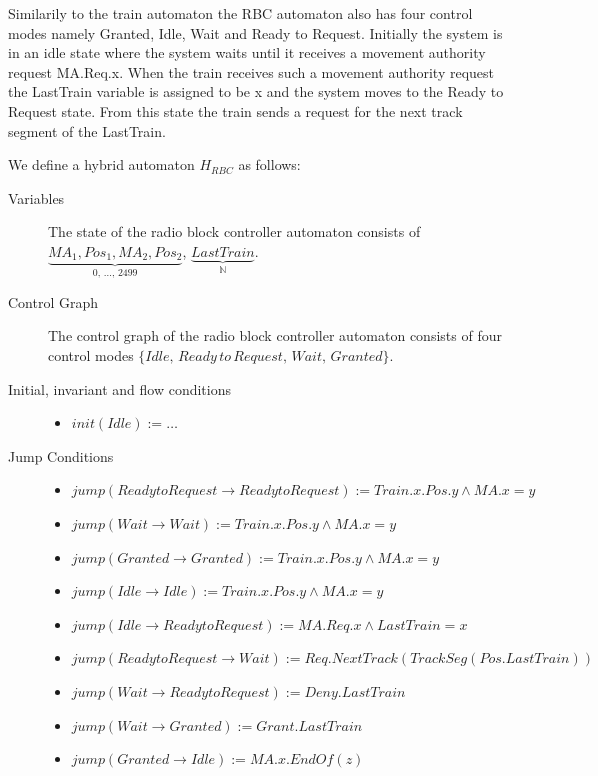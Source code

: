 \medskip
Similarily to the train automaton the RBC automaton also has four control modes namely Granted, Idle, Wait and Ready to Request. Initially the system is in an idle state where the system waits until it receives a movement authority request MA.Req.x. When the train receives such a movement authority request the LastTrain variable is assigned to be x and the system moves to the Ready to Request state.  From this state the train sends a request for the next track segment of the LastTrain.
\medskip

\begin{mydef}

We define a hybrid automaton $H_{RBC}$ as follows:
\begin{description}
\item[Variables] The state of the radio block controller automaton consists of $\underbrace{MA_1, Pos_1, MA_2, Pos_2}_\text{0, \ldots , 2499}$, \newline $\underbrace{LastTrain}_{\mathbb{N}}$.

\item[Control Graph] The control graph of the radio block controller automaton consists of four control modes $\{Idle, \, Ready \, to \, Request, \, Wait, \, Granted \}$.

\item[Initial, invariant and flow conditions] \hspace*{0mm}
	\begin{itemize}
	\item $init(Idle) :=   \ldots $

	\end{itemize}

\item[Jump Conditions] \hspace*{0mm}

	\begin{itemize}
	\item $jump(Ready to Request \to Ready to Request) := Train.x.Pos.y \wedge MA.x = y$
	\item $jump(Wait \to Wait) := Train.x.Pos.y \wedge MA.x = y$
	\item $jump(Granted \to Granted) := Train.x.Pos.y \wedge MA.x = y$
	\item $jump(Idle \to Idle) := Train.x.Pos.y \wedge MA.x = y$
	\item $jump(Idle \to Ready to Request) := MA.Req.x \wedge LastTrain = x$
	\item $jump(Ready to Request \to Wait) := Req.NextTrack(TrackSeg(Pos.LastTrain))$
	\item $jump(Wait \to Ready to Request) := Deny.LastTrain$
	\item $jump(Wait \to Granted) := Grant.LastTrain$
	\item $jump(Granted \to Idle) := MA.x.EndOf(z)$




\end{itemize}
\end{description}
\end{mydef}
